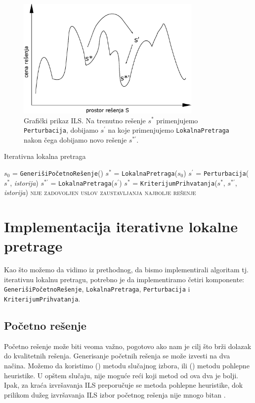 \documentclass[a4paper]{article}
\newcommand{\sstar}[0]{$\textit{s}^*$}
\newcommand{\squote}[0]{$\textit{s}^\prime$}
\newcommand{\lokalna}[0]{\small{\texttt{LokalnaPretraga}}}
\newcommand{\kriterijum}[0]{\small{\texttt{KriterijumPrihvatanja}}}
\newcommand{\generisi}[0]{\small{\texttt{GenerišiPočetnoRešenje}}}
\newcommand{\perturbacija}[0]{\small{\texttt{Perturbacija}}}
\begin{document}
\begin{figure}[h!]
  \centering
  \includegraphics[width=0.8\textwidth]{drawing4.eps}
  \caption{Grafički prikaz ILS. Na trenutno rešenje \sstar{} primenjujemo \perturbacija{}, dobijamo \squote{} na koje primenjujemo \lokalna{} nakon čega dobijamo novo rešenje $\textit{s}^{*\prime{}}$.}
  \label{figure:iterativna}
\end{figure}


\begin{algorithm}
  \caption{Iterativna lokalna pretraga}
  \label{alg:1}
  \begin{algorithmic}
  \STATE $\textit{s}_0$ = \generisi{}()
  \STATE \sstar{} = \lokalna{}($\textit{s}_0$)
  \REPEAT
  \STATE \squote{} = \perturbacija{}(\sstar{}, \textit{istorija})
  \STATE $\textit{s}^{*\prime}$ = \lokalna{}(\squote{})
  \STATE \sstar{} = \kriterijum{}(\sstar{}, $\textit{s}^{*\prime}$, \textit{istorija})
  \UNTIL \textsc{nije zadovoljen uslov zaustavljanja}
  \RETURN \textsc{najbolje rešenje}
  \end{algorithmic}
  \end{algorithm}

\section{Implementacija iterativne lokalne pretrage}
Kao što možemo da vidimo iz prethodnog, da bismo implementirali algoritam tj. iterativnu lokalnu pretragu, 
potrebno je da implementiramo četiri komponente: \generisi{}, \lokalna{}, \perturbacija{} i \kriterijum{}. 

\subsection{Početno rešenje}

Početno rešenje može biti veoma važno, pogotovo ako nam je cilj što brži dolazak do kvalitetnih rešenja. 
Generisanje početnih rešenja se može izvesti na dva načina. Možemo da koristimo () metodu slučajnog izbora, 
ili () metodu pohlepne heuristike. U opštem slučaju, nije moguće reći koji metod od ova dva je bolji. Ipak, za kraća 
izvršavanja ILS preporučuje se metoda pohlepne heuristike, dok prilikom dužeg izvršavanja ILS izbor početnog rešenja nije mnogo bitan \cite{beginnersIntroduction}.
\end{document}
